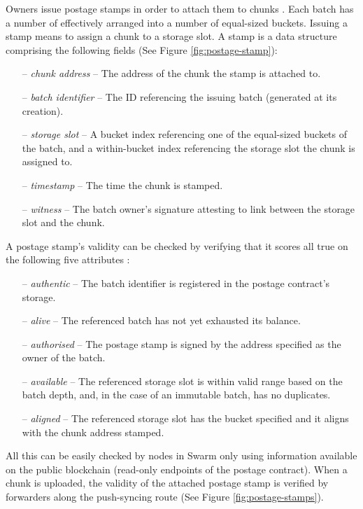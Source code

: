 Owners issue postage stamps in order to attach them to chunks%
. Each batch has a number of  effectively arranged into a number of equal-sized buckets. Issuing a stamp means to assign a chunk to a storage slot. A stamp is a data structure comprising the following fields (See Figure  \ref{fig:postage-stamp}):

\begin{itemize}[noitemsep]
    \item[--] \emph{chunk address} -- The address of the chunk the stamp is attached to. 
    \item[--] \emph{batch identifier} --  The ID referencing the issuing batch (generated at its creation).
    \item[--] \emph{storage slot} -- A bucket index referencing one of the equal-sized buckets of the batch, and a within-bucket index referencing the storage slot the chunk is assigned to.
    \item[--] \emph{timestamp} -- The time the chunk is stamped. 
    \item[--] \emph{witness} -- The batch owner's signature attesting to link between the storage slot and the chunk.
\end{itemize}

A postage stamp's validity can be checked by verifying that it scores all true on the following five attributes%
:

\begin{itemize}[noitemsep]
\item[--] \emph{authentic} -- The batch identifier is registered in the postage contract's storage.
\item[--] \emph{alive} -- The referenced batch has not yet exhausted its balance.
\item[--] \emph{authorised} -- The postage stamp is signed by the address specified as the owner of the batch. 
\item[--] \emph{available} -- The referenced storage slot is within valid range based on the batch depth, and, in the case of an immutable batch, has no duplicates.
\item[--] \emph{aligned} -- The referenced storage slot has the bucket specified and it aligns with the chunk address stamped.
\end{itemize}

All this can be easily checked by nodes in Swarm only using information available on the public blockchain (read-only endpoints of the postage contract). When a chunk is uploaded, the validity of the attached postage stamp is verified by forwarders along the push-syncing route  (See Figure \ref{fig:postage-stamps}).


